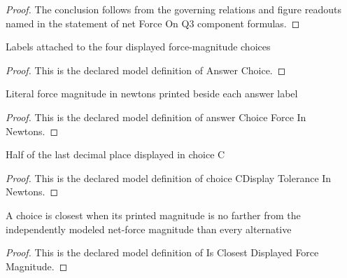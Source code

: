 \begin{proof}
  The conclusion follows from the governing relations and figure readouts named in the statement of net Force On Q3 component formulas.
\end{proof}
\begin{definition}
  \label{def:physics:phyx-mini-0890:phyxminiproblems-problemphyxmini0890-answerchoice}
  Labels attached to the four displayed force-magnitude choices
\end{definition}
\begin{proof}
  This is the declared model definition of Answer Choice.
\end{proof}
\begin{definition}
  \label{def:physics:phyx-mini-0890:phyxminiproblems-problemphyxmini0890-answerchoiceforceinnewtons}
  Literal force magnitude in newtons printed beside each answer label
\end{definition}
\begin{proof}
  This is the declared model definition of answer Choice Force In Newtons.
\end{proof}
\begin{definition}
  \label{def:physics:phyx-mini-0890:phyxminiproblems-problemphyxmini0890-choicecdisplaytoleranceinnewtons}
  Half of the last decimal place displayed in choice C
\end{definition}
\begin{proof}
  This is the declared model definition of choice CDisplay Tolerance In Newtons.
\end{proof}
\begin{definition}
  \label{def:physics:phyx-mini-0890:phyxminiproblems-problemphyxmini0890-isclosestdisplayedforcemagnitude}
  A choice is closest when its printed magnitude is no farther from the independently modeled net-force magnitude than every alternative
\end{definition}
\begin{proof}
  This is the declared model definition of Is Closest Displayed Force Magnitude.
\end{proof}
